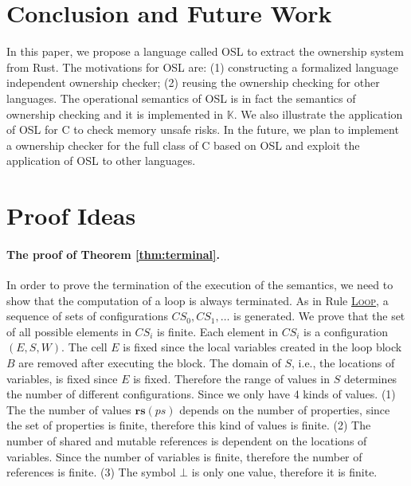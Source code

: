 \documentclass[runningheads]{llncs}
\def\refrule#1{\hyperref[#1]{\textsc{#1}}}
\newcommand{\terminal}[1]{\textbf{#1}}
\begin{document}
\section{Conclusion and Future Work}
\label{sec:conclusion}

In this paper, we propose a language called OSL to extract the ownership system from Rust.
The motivations for OSL are: (1) constructing a formalized language independent ownership checker; (2) 
reusing the ownership checking for other languages.
The operational semantics of OSL is in fact the semantics of ownership checking and it is implemented in $\mathbb{K}$.
We also illustrate the application of OSL for C to check memory unsafe risks.
In the future, we plan to implement a ownership checker for the full class of C based on OSL and exploit the application
of OSL to other languages.





\appendix
\section{Proof Ideas}
\label{appendix:proofidea}

\paragraph{The proof of Theorem \ref{thm:terminal}.} 
In order to prove the termination of the execution of the semantics, we need to show
that the computation of a loop is always terminated.
As in Rule \refrule{Loop}, a sequence of sets of configurations $CS_0,CS_1,\ldots$ is generated.
We prove that the set of all possible elements in $CS_i$ is finite.
Each element in $CS_i$ is a configuration $(E,S,W)$.
The cell $E$ is fixed since the local variables created in the loop block $B$ are removed
after executing the block. 
The domain of $S$, i.e., the locations of variables, is  fixed since $E$ is fixed.
Therefore the range of values in $S$ determines the number of different configurations.
Since we only have 4 kinds of values. 
(1) The the number of values $\terminal{rs}(ps)$ depends on the number of properties, since the set of properties is finite, therefore this kind of values is finite.
(2) The number of shared and mutable references is dependent on the locations of variables.
Since the number of variables is finite, therefore the number of references is finite.
(3) The symbol $\bot$ is only one value, therefore it is finite.
\end{document}
